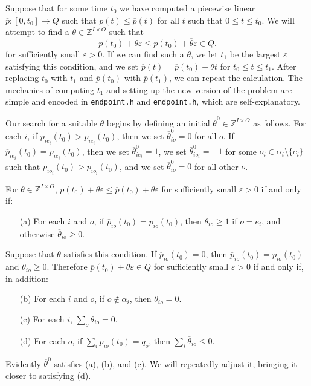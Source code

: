 \documentclass[12pt]{article}
\theoremstyle{definition}
\newcommand{\In}{\mathbb{Z}}
\newcommand{\barp}{\overline{p}}
\newcommand{\bartheta}{{\overline \theta}}
\newcommand{\varep}{\varepsilon}
\begin{document}
\begin{appendix}
Suppose that for some time $t_0$ we have computed a piecewise linear
$\barp \colon [0,t_0] \to Q$ such that $p(t) \le \barp(t)$ for all $t$
such that $0 \le t \le t_0$.  We will attempt to find a $\bartheta \in
\In^{I \times O}$ such that
$$p(t_0) + \theta \varep \le \barp(t_0) + \bartheta \varep \in Q.$$
for sufficiently small $\varep > 0$.  If we can find such a
$\bartheta$, we let $t_1$ be the largest $\varep$ satisfying this
condition, and we set $\barp(t) = \barp(t_0) + \bartheta t$ for $t_0
\le t \le t_1$.  After replacing $t_0$ with $t_1$ and $\barp(t_0)$
with $\barp(t_1)$, we can repeat the calculation.  The mechanics of
computing $t_1$ and setting up the new version of the problem are
simple and encoded in \texttt{endpoint.h} and \texttt{endpoint.h},
which are self-explanatory.

Our search for a suitable $\bartheta$ begins by defining an initial
$\bartheta^0 \in \In^{I \times O}$ as follows.  For each $i$, if
$\barp_{ie_i}(t_0) > p_{ie_i}(t_0)$, then we set $\bartheta^0_{io} =
0$ for all $o$.  If $\barp_{ie_i}(t_0) = p_{ie_i}(t_0)$, then we set
$\bartheta^0_{ie_i} = 1$, we set $\bartheta^0_{io_i} = -1$ for some
$o_i \in \alpha_i \setminus \{e_i\}$ such that $\barp_{io_i}(t_0) >
p_{io_i}(t_0)$, and we set $\bartheta^0_{io} = 0$ for all other $o$.


For $\bartheta \in \In^{I \times O}$, $p(t_0) + \theta \varep \le
\barp(t_0) + \bartheta \varep$ for sufficiently small $\varep > 0$ if
and only if:
\begin{enumerate}  
  \item[(a)] For each $i$ and $o$, if $\barp_{io}(t_0) = p_{io}(t_0)$, then
        $\bartheta_{io} \ge 1$ if $o = e_i$, and otherwise
        $\bartheta_{io} \ge 0$.
\end{enumerate}
Suppose that $\bartheta$ satisfies this condition.  If
$\barp_{io}(t_0) = 0$, then $\barp_{io}(t_0) = p_{io}(t_0)$ and
$\theta_{io} \ge 0$.  Therefore $\barp(t_0) + \bartheta \varep \in Q$
for sufficiently small $\varep > 0$ if and only if, in addition:
\begin{enumerate} 
  \item[(b)] For each $i$ and $o$, if $o \notin \alpha_i$, then $\bartheta_{io} = 0$.
  \item[(c)] For each $i$, $\sum_o \bartheta_{io} = 0$.
  \item[(d)] For each $o$, if $\sum_i \barp_{io}(t_0) = q_o$, then $\sum_i \bartheta_{io} \le 0$.
\end{enumerate}

Evidently $\bartheta^0$ satisfies (a), (b), and (c).  We will
repeatedly adjust it, bringing it closer to satisfying (d).


\end{appendix}
\end{document}
